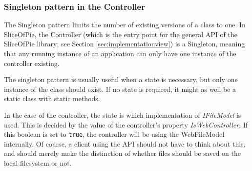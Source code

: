 \subsubsection{Singleton pattern in the Controller}

The Singleton pattern limits the number of existing versions of a class to one. In SliceOfPie,
the Controller (which is the entry point for the general API of the SliceOfPie library; see
Section \ref{sec:implementationview}) is a Singleton, meaning that any running instance of
an application can only have one instance of the controller existing.

The singleton pattern is usually useful when a state is necessary, but only one instance of the
class should exist. If no state is required, it might as well be a static class with static
methods.

In the case of the controller, the state is which implementation of \emph{IFileModel} is used.
This is decided by the value of the controller's property \emph{IsWebController}. If this boolean
is set to \verb|true|, the controller will be using the WebFileModel internally. Of course, a
client using the API should not have to think about this, and should merely make the distinction
of whether files should be saved on the local filesystem or not.
